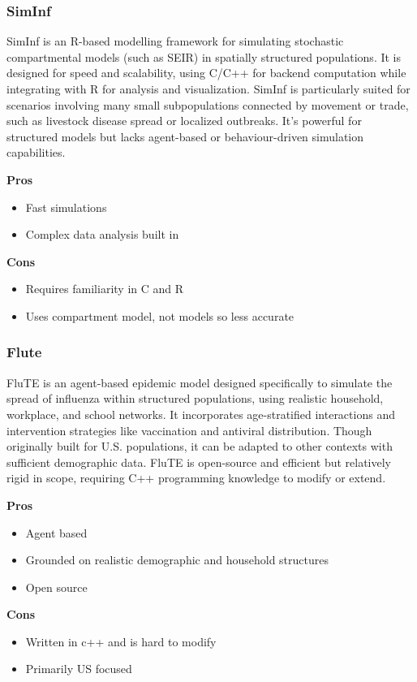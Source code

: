\subsubsection*{SimInf}
SimInf is an R-based modelling framework for simulating stochastic compartmental models (such as SEIR) in spatially structured populations. It is designed for speed and scalability, using C/C++ for backend computation while integrating with R for analysis and visualization. SimInf is particularly suited for scenarios involving many small subpopulations connected by movement or trade, such as livestock disease spread or localized outbreaks. It’s powerful for structured models but lacks agent-based or behaviour-driven simulation capabilities.

\noindent
\begin{minipage}[t]{0.48\textwidth}
\textbf{Pros}
\begin{itemize}
    \item Fast simulations
    \item Complex data analysis built in
\end{itemize}
\end{minipage}
\hfill
\begin{minipage}[t]{0.48\textwidth}
\textbf{Cons}
\begin{itemize}
    \item Requires familiarity in C and R
    \item Uses compartment model, not models so less accurate
\end{itemize}
\end{minipage}

\subsubsection*{Flute}
FluTE is an agent-based epidemic model designed specifically to simulate the spread of influenza within structured populations, using realistic household, workplace, and school networks. It incorporates age-stratified interactions and intervention strategies like vaccination and antiviral distribution. Though originally built for U.S. populations, it can be adapted to other contexts with sufficient demographic data. FluTE is open-source and efficient but relatively rigid in scope, requiring C++ programming knowledge to modify or extend.

\noindent
\begin{minipage}[t]{0.48\textwidth}
\textbf{Pros}
\begin{itemize}
    \item Agent based
    \item Grounded on realistic demographic and household structures
    \item Open source
\end{itemize}
\end{minipage}
\hfill
\begin{minipage}[t]{0.48\textwidth}
\textbf{Cons}
\begin{itemize}
    \item Written in c++ and is hard to modify
    \item Primarily US focused
\end{itemize}
\end{minipage}

